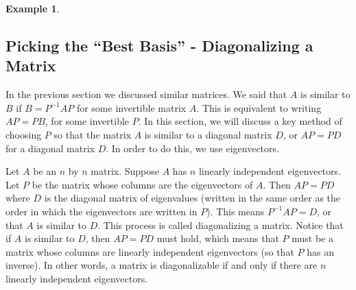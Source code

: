 \documentclass[10pt]{article}
\theoremstyle{plain}
\theoremstyle{box}
\newtheorem{example}{Example}
\begin{document}
\begin{example}
\begin{itemize}
\end{itemize}
\end{example}


\subsection{Picking the ``Best Basis'' - Diagonalizing a Matrix}
In the previous section we discussed similar matrices. We said that $A$ is similar to $B$ if $B=P^{-1}AP$ for some invertible matrix $A$. This is equivalent to writing $AP=PB$, for some invertible $P$. In this section, we will discuss a key method of choosing $P$ so that the matrix $A$ is similar to a diagonal matrix $D$, or $AP=PD$ for a diagonal matrix $D$. In order to do this, we use eigenvectors.

Let $A$ be an $n$ by $n$ matrix.  Suppose $A$ has $n$ linearly independent eigenvectors. Let $P$ be the matrix whose columns are the eigenvectors of $A$.  Then $AP = PD$ where $D$ is the diagonal matrix of eigenvalues (written in the same order as the order in which the eigenvectors are written in $P$).  This means $P^{-1}AP=D$, or that $A$ is similar to $D$. This process is called diagonalizing a matrix. Notice that if $A$ is similar to $D$, then $AP=PD$ must hold, which means that $P$ must be a matrix whose columns are linearly independent eigenvectors (so that $P$ has an inverse). In other words, a matrix is diagonalizable if and only if there are $n$ linearly independent eigenvectors. 
\end{document}
